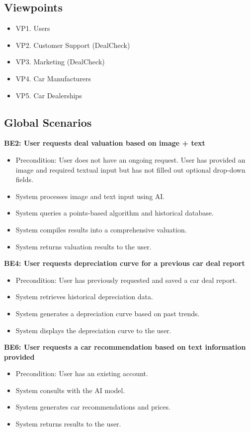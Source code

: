 \documentclass[]{article}
\begin{document}
\subsection{Viewpoints}
\begin{itemize}
    \item VP1. Users
    \item VP2. Customer Support (DealCheck)
    \item VP3. Marketing (DealCheck)
    \item VP4. Car Manufacturers
    \item VP5. Car Dealerships
\end{itemize}

\subsection{Global Scenarios}
\textbf{BE2: User requests deal valuation based on image + text}
\begin{itemize}
    \item Precondition: User does not have an ongoing request. User has provided an image and required textual input but has not filled out optional drop-down fields.
    \item System processes image and text input using AI.
    \item System queries a points-based algorithm and historical database.
    \item System compiles results into a comprehensive valuation.
    \item System returns valuation results to the user.
\end{itemize}

\textbf{BE4: User requests depreciation curve for a previous car deal report}
\begin{itemize}
    \item Precondition: User has previously requested and saved a car deal report.
    \item System retrieves historical depreciation data.
    \item System generates a depreciation curve based on past trends.
    \item System displays the depreciation curve to the user.
\end{itemize}

\textbf{BE6: User requests a car recommendation based on text information provided}
\begin{itemize}
    \item Precondition: User has an existing account.
    \item System consults with the AI model.
    \item System generates car recommendations and prices.
    \item System returns results to the user.
\end{itemize}
\end{document}
